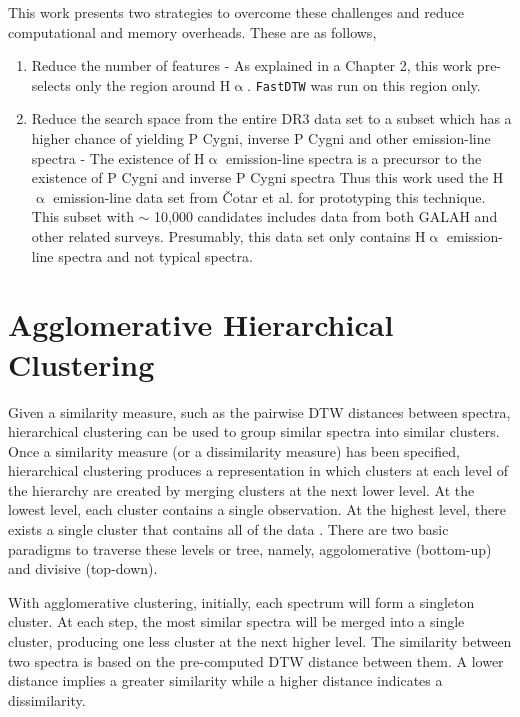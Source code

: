 This work presents two strategies to overcome these challenges and reduce computational and memory overheads. These are as follows,

\begin{enumerate}
    \item Reduce the number of features - As explained in a Chapter 2, this work pre-selects only the region around H$\upalpha$. \texttt{FastDTW} was run on this region only.
    \item Reduce the search space from the entire DR3 data set to a subset which has a higher chance of yielding P Cygni, inverse P Cygni and other emission-line spectra - The existence of H$\upalpha$ emission-line spectra is a precursor to the existence of P Cygni and inverse P Cygni spectra Thus this work used the H$\upalpha$ emission-line data set from Čotar et al.\cite{vcotar2021galah} for prototyping this technique. This subset with $\sim$ 10,000 candidates includes data from both GALAH and other related surveys. Presumably, this data set only contains H$\upalpha$ emission-line spectra and not typical spectra.
\end{enumerate}

\section{Agglomerative Hierarchical Clustering}

Given a similarity measure, such as the pairwise DTW distances between spectra, hierarchical clustering can be used to group similar spectra into similar clusters. Once a similarity measure (or a dissimilarity measure) has been specified, hierarchical clustering produces a representation in which clusters at each level of the hierarchy are created by merging clusters at the next lower level. At the lowest level, each cluster contains a single observation. At the highest level, there exists a single cluster that contains all of the data \cite{hastie2009elements}. There are two basic paradigms to traverse these levels or tree, namely, aggolomerative (bottom-up) and divisive (top-down). 

With agglomerative clustering, initially, each spectrum will form a singleton cluster. At each step, the most similar spectra will be merged into a single cluster, producing one less cluster at the next higher level. The similarity between two spectra is based on the pre-computed DTW distance between them. A lower distance implies a greater similarity while a higher distance indicates a dissimilarity.  

